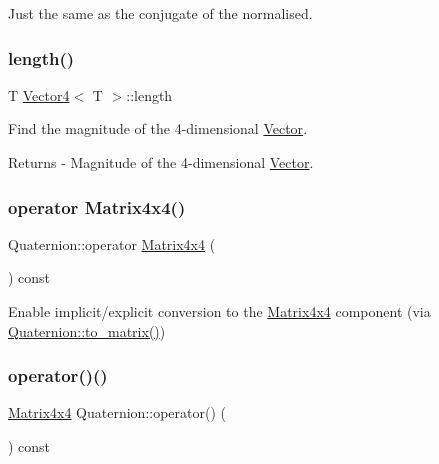 Just the same as the conjugate of the normalised. \mbox{\label{class_quaternion_a1c8ab62fe32713c21353d71a1b23b0f2}} 
\subsubsection{\texorpdfstring{length()}{length()}}
{\footnotesize\ttfamily T \mbox{\hyperlink{class_vector4}{Vector4}}$<$ T $>$\+::length}

Find the magnitude of the 4-\/dimensional \mbox{\hyperlink{class_vector}{Vector}}. \begin{DoxyReturn}{Returns}
-\/ Magnitude of the 4-\/dimensional \mbox{\hyperlink{class_vector}{Vector}}. 
\end{DoxyReturn}
\mbox{\label{class_quaternion_a31f2b4a704b8ba5b677d0cf7ecec163d}} 
\subsubsection{\texorpdfstring{operator Matrix4x4()}{operator Matrix4x4()}}
{\footnotesize\ttfamily Quaternion\+::operator \mbox{\hyperlink{class_matrix4x4}{Matrix4x4}} (\begin{DoxyParamCaption}{ }\end{DoxyParamCaption}) const}

Enable implicit/explicit conversion to the \mbox{\hyperlink{class_matrix4x4}{Matrix4x4}} component (via \mbox{\hyperlink{class_quaternion_ae0309902fc8b7d8aa1f4075a73fee928}{Quaternion\+::to\+\_\+matrix()}}) \mbox{\label{class_quaternion_afe406f4a387794c924b0459b9514c68d}} 
\subsubsection{\texorpdfstring{operator()()}{operator()()}}
{\footnotesize\ttfamily \mbox{\hyperlink{class_matrix4x4}{Matrix4x4}} Quaternion\+::operator() (\begin{DoxyParamCaption}{ }\end{DoxyParamCaption}) const}

